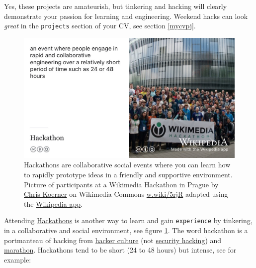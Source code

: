 \documentclass[
]{book}
\begin{document}
Yes, these projects are amateurish, but tinkering and hacking will clearly demonstrate your passion for learning and engineering. Weekend hacks can look \emph{great} in the \texttt{projects} section of your CV, see section \ref{mycvpj}.

\begin{figure}

{\centering \includegraphics[width=0.99\linewidth]{images/hackathon} 

}

\caption{Hackathons are collaborative social events where you can learn how to rapidly prototype ideas in a friendly and supportive environment. Picture of participants at a Wikimedia Hackathon in Prague by \href{https://en.wikipedia.org/wiki/User:Ckoerner}{Chris Koerner} on Wikimedia Commons \href{https://w.wiki/5rjR}{w.wiki/5rjR} adapted using the \href{https://apps.apple.com/us/app/wikipedia/id324715238}{Wikipedia app}.}\label{fig:hackathon-fig}
\end{figure}



Attending \href{https://en.wikipedia.org/wiki/Hackathon}{Hackathons} is another way to learn and gain \texttt{experience} by tinkering, in a collaborative and social environment, see figure \ref{fig:hackathon-fig}. The word hackathon is a portmanteau of hacking from \href{https://en.wikipedia.org/wiki/Hacker_culture}{hacker culture} (not \href{https://en.wikipedia.org/wiki/Security_hacker}{security hacking}) and \href{https://en.wikipedia.org/wiki/Marathon}{marathon}. Hackathons tend to be short (24 to 48 hours) but intense, see for example:
\end{document}
